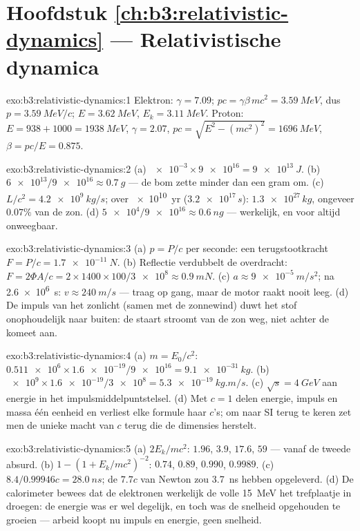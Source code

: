 \section*{Hoofdstuk \ref{ch:b3:relativistic-dynamics} --- Relativistische dynamica}

\begin{solution}{exo:b3:relativistic-dynamics:1}
Elektron: $\gamma = 7.09$; $pc = \gamma\beta\,mc^2 = \qty{3.59}{MeV}$,
dus $p = \qty{3.59}{MeV}/c$; $E = \qty{3.62}{MeV}$, $E_k =
\qty{3.11}{MeV}$. Proton: $E = 938 + 1000 = \qty{1938}{MeV}$, $\gamma
= 2.07$, $pc = \sqrt{E^2 - (mc^2)^2} = \qty{1696}{MeV}$, $\beta =
pc/E = 0.875$.
\end{solution}

\begin{solution}{exo:b3:relativistic-dynamics:2}
(a) $\num{e-3} \times \num{9e16} = \qty{9e13}{J}$. (b) $\num{6e13}/
\num{9e16} \approx \qty{0.7}{g}$ --- de bom zette minder dan een gram
om. (c) $L/c^2 = \qty{4.2e9}{kg/s}$; over \qty{e10}{yr}
($\num{3.2e17}{}\,\unit{s}$): $\num{1.3e27}{}\,\unit{kg}$, ongeveer
$0.07\%$ van de zon. (d) $\num{5e4}/\num{9e16} \approx
\qty{0.6}{ng}$ --- werkelijk, en voor altijd onweegbaar.
\end{solution}

\begin{solution}{exo:b3:relativistic-dynamics:3}
(a) $p = P/c$ per seconde: een terugstootkracht $F = P/c = \qty{1.7e-11}{N}$. (b) Reflectie verdubbelt de overdracht: $F = 2\Phi A/c =
2 \times 1400 \times 100/\num{3e8} \approx \qty{0.9}{mN}$. (c) $a
\approx \qty{9e-5}{m/s^2}$; na \qty{2.6e6}{s}: $v \approx
\qty{240}{m/s}$ --- traag op gang, maar de motor raakt nooit leeg. (d)
De impuls van het zonlicht (samen met de zonnewind) duwt het stof
onophoudelijk naar buiten: de staart stroomt van de zon weg, niet achter
de komeet aan.
\end{solution}

\begin{solution}{exo:b3:relativistic-dynamics:4}
(a) $m = E_0/c^2$: $\num{0.511e6} \times \num{1.6e-19}/\num{9e16} =
\qty{9.1e-31}{kg}$. (b) $\num{e9} \times \num{1.6e-19}/\num{3e8} =
\qty{5.3e-19}{kg.m/s}$. (c) $\sqrt s = \qty{4}{GeV}$ aan energie in het
impulsmiddelpuntstelsel. (d) Met $c = 1$ delen energie, impuls en massa
één eenheid en verliest elke formule haar $c$'s; om naar SI terug te
keren zet men de unieke macht van $c$ terug die de dimensies herstelt.
\end{solution}

\begin{solution}{exo:b3:relativistic-dynamics:5}
(a) $2E_k/mc^2$: $1.96$, $3.9$, $17.6$, $59$ --- vanaf de tweede absurd.
(b) $1 - (1 + E_k/mc^2)^{-2}$: $0.74$, $0.89$, $0.990$, $0.9989$. (c)
$8.4/0.99946c = \qty{28.0}{ns}$; de $7.7c$ van Newton zou \qty{3.7}{ns}
hebben opgeleverd. (d) De calorimeter bewees dat de elektronen
werkelijk de volle \qty{15}{MeV} het trefplaatje in droegen: de energie
was er wel degelijk, en toch was de snelheid opgehouden te groeien ---
arbeid koopt nu impuls en energie, geen snelheid.
\end{solution}


